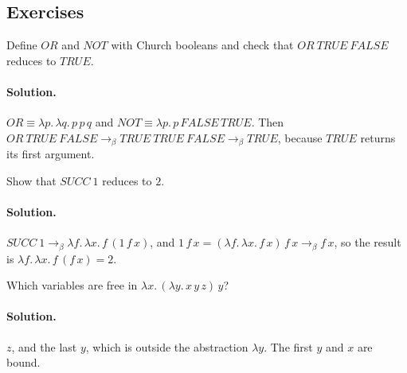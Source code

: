 \subsection{Exercises}

\begin{exercise}
Define $\mathit{OR}$ and $\mathit{NOT}$ with Church booleans and check that
$\mathit{OR}\ \mathit{TRUE}\ \mathit{FALSE}$ reduces to $\mathit{TRUE}$.
\end{exercise}

\paragraph{Solution.} $\mathit{OR} \equiv \lambda p.\, \lambda q.\, p\, p\, q$ and
$\mathit{NOT} \equiv \lambda p.\, p\, \mathit{FALSE}\, \mathit{TRUE}$. Then
$\mathit{OR}\ \mathit{TRUE}\ \mathit{FALSE} \to_\beta \mathit{TRUE}\ \mathit{TRUE}\ \mathit{FALSE}
\to_\beta \mathit{TRUE}$, because $\mathit{TRUE}$ returns its first argument.

\begin{exercise}
Show that $\mathit{SUCC}\ 1$ reduces to $2$.
\end{exercise}

\paragraph{Solution.} $\mathit{SUCC}\ 1 \to_\beta \lambda f.\, \lambda x.\, f\,(1\, f\, x)$,
and $1\, f\, x = (\lambda f.\, \lambda x.\, f\, x)\, f\, x \to_\beta f\, x$, so the result is
$\lambda f.\, \lambda x.\, f\,(f\, x) = 2$.

\begin{exercise}
Which variables are free in $\lambda x.\, (\lambda y.\, x\, y\, z)\, y$?
\end{exercise}

\paragraph{Solution.} $z$, and the last $y$, which is outside the abstraction
$\lambda y$. The first $y$ and $x$ are bound.
